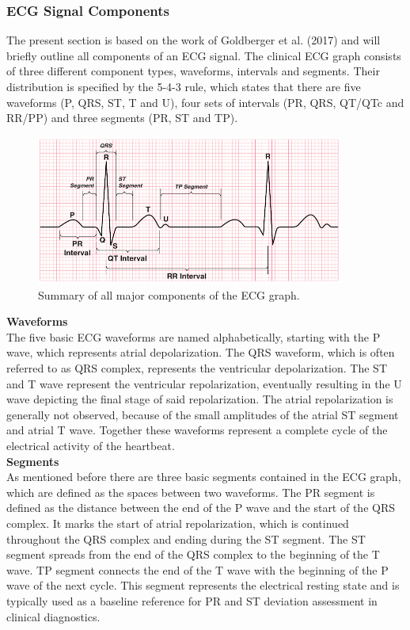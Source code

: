 \subsubsection{ECG Signal Components}
The present section is based on the work of Goldberger et al. (2017) and will briefly outline all components of an ECG signal. The clinical ECG graph consists of three different component types, waveforms, intervals and segments. Their distribution is specified by the 5-4-3 rule, which states that there are five waveforms (P, QRS, ST, T and U), four sets of intervals (PR, QRS, QT/QTc and RR/PP) and three segments (PR, ST and TP)\cite{GOLDBERGER2017}.

\begin{figure}[ht]
\centering
\includegraphics[width=0.9\textwidth]{images/ecgcomp.png}
\caption{Summary of all major components of the ECG graph.}
\label{ecgcompImg}
\end{figure}

\textbf{Waveforms}\\ 
The five basic ECG waveforms are named alphabetically, starting with the P wave, which represents atrial depolarization. The QRS waveform, which is often referred to as QRS complex, represents the ventricular depolarization. The ST and T wave represent the ventricular repolarization, eventually resulting in the U wave depicting the final stage of said repolarization. The atrial repolarization is generally not observed, because of the small amplitudes of the atrial ST segment and atrial T wave. Together these waveforms represent a complete cycle of the electrical activity of the heartbeat.\\

\textbf{Segments}\\ 
As mentioned before there are three basic segments contained in the ECG graph, which are defined as the spaces between two waveforms. The PR segment is defined as the distance between the end of the P wave and the start of the QRS complex. It marks the start of atrial repolarization, which is continued throughout the QRS complex and ending during the ST segment. The ST segment spreads from the end of the QRS complex to the beginning of the T wave. TP segment connects the end of the T wave with the beginning of the P wave of the next cycle. This segment represents the electrical resting state and is typically used as a baseline reference for PR and ST deviation assessment in clinical diagnostics.\\

